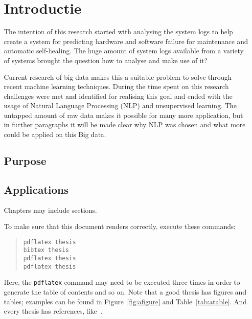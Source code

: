 \chapter{Introductie}  \label{ch:introduction}



The intention of this research started with analysing the system logs to help create a system for predicting hardware and software failure for maintenance and automatic self-healing. The huge amount of system logs available from a variety of systems brought the question how to analyse and make use of it? 

Current research of big data makes this a suitable problem to solve through recent machine learning techniques. 
During the time spent on this research challenges were met and identified for realising this goal and ended with the usage of Natural Language Processing (NLP) and unsupervised learning.  The untapped amount of raw data makes it possible for many more application, but in further paragraphs it will be made clear why NLP was chosen and what more could be applied on this Big data. 
 
 
 
 
 
 
 
 
 
 
 
\section{Purpose}



\section{Applications}
Chapters may include sections.

To make sure that this document renders correctly, execute these commands:
\begin{quote}
\begin{verbatim}
pdflatex thesis
bibtex thesis
pdflatex thesis
pdflatex thesis
\end{verbatim}
\end{quote}
Here, the \verb|pdflatex| command may need to be executed three times in order to generate the table of contents and so on. 
Note that a good thesis has figures and tables; examples can be found in Figure~\ref{fig:afigure} and Table~\ref{tab:atable}. And every thesis has references, like~\cite{brilliantgift15}.

